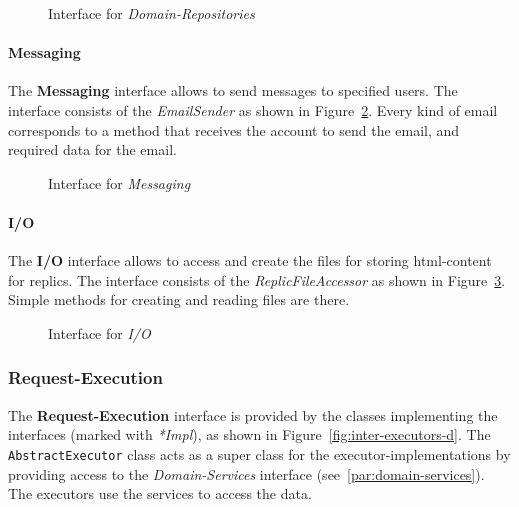\begin{figure}
    \centering

    \caption{Interface for \textit{Domain-Repositories}}
    \label{fig:domain-repositories}
\end{figure}

\paragraph{Messaging}
The \textbf{Messaging} interface allows to send messages to specified users.
The interface consists of the \textit{EmailSender} as shown in Figure~\ref{fig:domain-messaging}.
Every kind of email corresponds to a method that receives the account to send the email, and required data for the email.

\begin{figure}
    \centering

    \caption{Interface for \textit{Messaging}}
    \label{fig:domain-messaging}
\end{figure}

\paragraph{I/O}\label{par:io}
The \textbf{I/O} interface allows to access and create the files for storing html-content for replics.
The interface consists of the \textit{ReplicFileAccessor} as shown in Figure~\ref{fig:domain-io}.
Simple methods for creating and reading files are there.

\begin{figure}
    \centering

    \caption{Interface for \textit{I/O}}
    \label{fig:domain-io}
\end{figure}

\subsubsection{Request-Execution}
The \textbf{Request-Execution} interface is provided by the classes implementing the interfaces (marked with \textit{*Impl}), as shown in Figure~\ref{fig:inter-executors-d}.
The \texttt{AbstractExecutor} class acts as a super class for the executor-implementations by providing access to the \textit{Domain-Services} interface (see~\ref{par:domain-services}).
The executors use the services to access the data.

